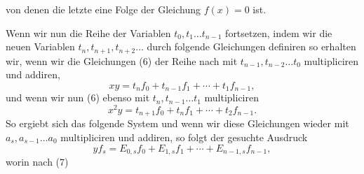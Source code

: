 von denen die letzte eine Folge der Gleichung $f(x) = 0$ ist.

Wenn wir nun die Reihe der Variablen $t_0, t_1 \ldots t_{n-1}$ fortsetzen, indem wir die neuen Variablen $t_n, t_{n+1}, t_{n+2} \ldots$ durch folgende Gleichungen definiren
so erhalten wir, wenn wir die Gleichungen (6) der Reihe nach mit $t_{n-1}, t_{n-2} \ldots t_0$ multipliciren und addiren,
\[
x y = t_n f_0 + t_{n-1} f_1 + \cdots + t_1 f_{n-1},
\]
und wenn wir nun (6) ebenso mit $t_n, t_{n-1} \ldots t_1$ multipliciren
\[
x^2 y = t_{n+1} f_0 + t_n f_1 + \cdots + t_2 f_{n-1}.
\]
So ergiebt sich das folgende System
und wenn wir diese Gleichungen wieder mit $a_s, a_{s-1} \ldots a_0$ multipliciren und addiren, so folgt der gesuchte Ausdruck
\[
y f_s = E_{0,s} f_0 + E_{1,s} f_1 + \cdots + E_{n-1,s} f_{n-1},
\]
worin nach (7)
